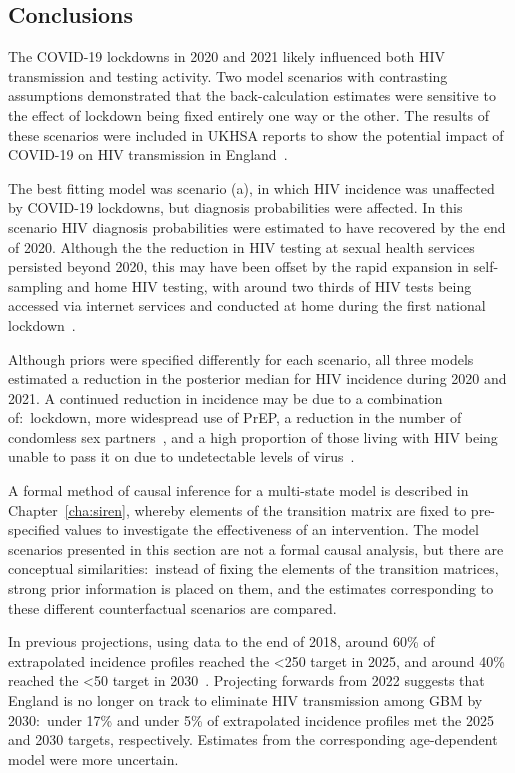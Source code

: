 \subsection{Conclusions}

The COVID-19 lockdowns in 2020 and 2021 likely influenced both HIV transmission and testing activity. Two model scenarios with contrasting assumptions demonstrated that the back-calculation estimates were sensitive to the effect of lockdown being fixed entirely one way or the other. The results of these scenarios were included in UKHSA reports to show the potential impact of COVID-19 on HIV transmission in England~\parencite{Martin2022-iy}.

The best fitting model was scenario (a), in which HIV incidence was unaffected by COVID-19 lockdowns, but diagnosis probabilities were affected. In this scenario HIV diagnosis probabilities were estimated to have recovered by the end of 2020. Although the the reduction in HIV testing at sexual health services persisted beyond 2020, this may have been offset by the rapid expansion in self-sampling and home HIV testing, with around two thirds of HIV tests being accessed via internet services and conducted at home during the first national lockdown~\parencite{Wenlock2022-zk, Public_Health_England2020-qr}.

Although priors were specified differently for each scenario, all three models estimated a reduction in the posterior median for HIV incidence during 2020 and 2021. A continued reduction in incidence may be due to a combination of:\ lockdown, more widespread use of PrEP, a reduction in the number of condomless sex partners~\parencite{Pebody2021-fb}, and a high proportion of those living with HIV being unable to pass it on due to undetectable levels of virus~\parencite{World_Health_Organization2023-xi}.

A formal method of causal inference for a multi-state model is described in Chapter~\ref{cha:siren}, whereby elements of the transition matrix are fixed to pre-specified values to investigate the effectiveness of an intervention. The model scenarios presented in this section are not a formal causal analysis, but there are conceptual similarities:\ instead of fixing the elements of the transition matrices, strong prior information is placed on them, and the estimates corresponding to these different counterfactual scenarios are compared.

In previous projections, using data to the end of 2018, around 60\% of extrapolated incidence profiles reached the <250 target in 2025, and around 40\% reached the <50 target in 2030~\parencite{Brizzi2021-zl}. Projecting forwards from 2022 suggests that England is no longer on track to eliminate HIV transmission among GBM by 2030:\ under 17\% and under 5\% of extrapolated incidence profiles met the 2025 and 2030 targets, respectively. Estimates from the corresponding age-dependent model were more uncertain.

